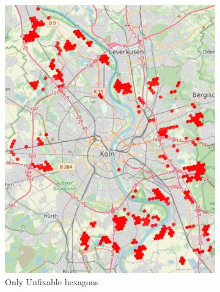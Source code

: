 \begin{figure}
     \centering
     \begin{subfigure}[b]{0.30\textwidth}
         \centering
         \includegraphics[width=\textwidth]{Figures/results/problematic_hexagons/unfixable.png}
         \caption{Only Unfixable hexagons}
         \label{fig:only_unfixable_hexagons}
     \end{subfigure}
     \hfill
     \begin{subfigure}[b]{0.30\textwidth}
         \centering

\end{subfigure}
\end{figure}
